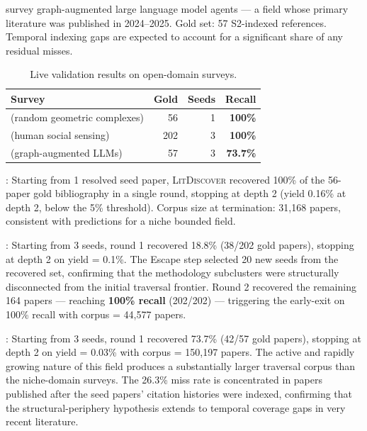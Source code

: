 \documentclass[12pt]{article}
\newcommand{\ldiscover}{\textsc{LitDiscover}}
\begin{document}
\citet{Liu2025} survey graph-augmented large language model agents --- a field whose primary
literature was published in 2024--2025. Gold set: 57 S2-indexed references. Temporal
indexing gaps are expected to account for a significant share of any residual misses.

\begin{table}[htbp]
\centering
\caption{Live validation results on open-domain surveys.}
\label{tab:live}
\begin{tabular}{@{}p{3.4cm}rrr@{}}
\toprule
Survey & Gold & Seeds & Recall \\
\midrule
\citet{Bobrowski2018} \newline (random geometric complexes) & 56 & 1 & \textbf{100\%} \\
\addlinespace
\citet{Galesic2021} \newline (human social sensing) & 202 & 3 & \textbf{100\%} \\
\addlinespace
\citet{Liu2025} \newline (graph-augmented LLMs) & 57 & 3 & \textbf{73.7\%} \\
\bottomrule
\end{tabular}
\end{table}

\textbf{\citet{Bobrowski2018}}: Starting from 1 resolved seed paper, \ldiscover{}
recovered 100\% of the 56-paper gold bibliography in a single round, stopping at depth 2
(yield 0.16\% at depth 2, below the 5\% threshold). Corpus size at termination: 31,168
papers, consistent with predictions for a niche bounded field.

\textbf{\citet{Galesic2021}}: Starting from 3 seeds, round 1 recovered 18.8\%
(38/202 gold papers), stopping at depth 2 on yield = 0.1\%. The Escape step selected 20
new seeds from the recovered set, confirming that the methodology subclusters were
structurally disconnected from the initial traversal frontier. Round 2 recovered the
remaining 164 papers --- reaching \textbf{100\% recall} (202/202) --- triggering the
early-exit on 100\% recall with corpus = 44,577 papers.

\textbf{\citet{Liu2025}}: Starting from 3 seeds, round 1 recovered 73.7\% (42/57 gold
papers), stopping at depth 2 on yield = 0.03\% with corpus = 150,197 papers. The active
and rapidly growing nature of this field produces a substantially larger traversal corpus
than the niche-domain surveys. The 26.3\% miss rate is concentrated in papers published
after the seed papers' citation histories were indexed, confirming that the
structural-periphery hypothesis extends to temporal coverage gaps in very recent
literature.
\end{document}
